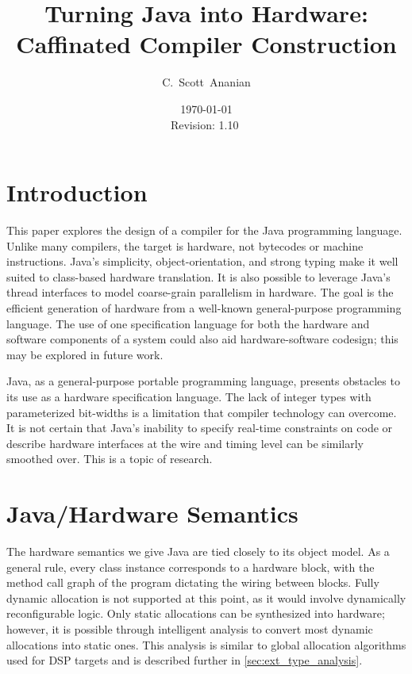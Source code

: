 \documentclass[11pt,notitlepage,twocolumn]{article}
\author{C.~Scott~Ananian}
\title{Turning Java into Hardware: \\ Caffinated Compiler Construction}
\date{\today \\ $ $Revision: 1.10 $ $}
\begin{document}

\maketitle

\section{Introduction}
This paper explores the design of a compiler for the Java
programming language.  Unlike many compilers, the target is hardware,
not bytecodes or machine instructions.
Java's simplicity, object-orientation, and
strong typing make it well suited to class-based hardware
translation.  It is also possible to leverage Java's thread interfaces
to model coarse-grain parallelism in hardware.  The goal is the
efficient generation of hardware from a well-known general-purpose
programming language.  The use of one specification language for both
the hardware and software components of a system could also aid
hardware-software codesign; this may be explored in future work.

Java, as a general-purpose portable programming language, 
presents obstacles to its use as a hardware specification language.
The lack of integer types with parameterized bit-widths is a
limitation that compiler technology can overcome.  It is not certain
that Java's inability to specify real-time constraints on code or
describe hardware interfaces at the wire and timing level can be
similarly smoothed over.  This is a topic of research.

\section{Java/Hardware Semantics}
The hardware semantics we give Java are tied closely to its object model.
As a general rule, every class instance corresponds to a hardware
block, with the method call graph of the program dictating the wiring
between blocks.  Fully dynamic allocation is not supported at this
point, as it would involve dynamically reconfigurable logic.  Only
static allocations can be synthesized into hardware; however, it is
possible through intelligent analysis to convert most dynamic
allocations into static ones.  This analysis is similar to 
global allocation algorithms used
for DSP targets \cite{DSP_targets} and is
described further in \ref{sec:ext_type_analysis}.
\end{document}
